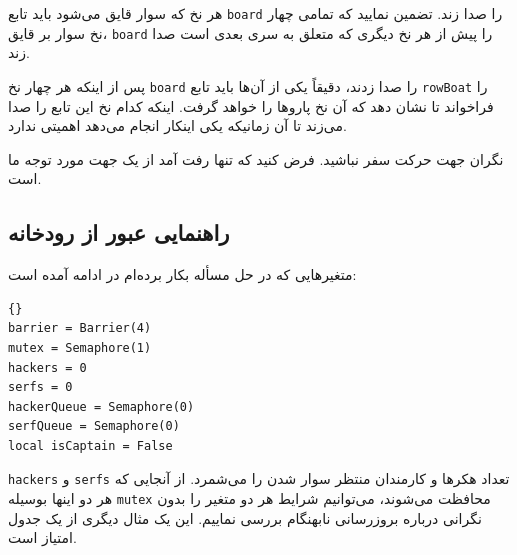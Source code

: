 \documentclass{book}
\newcommand{\clearemptydoublepage}{\newpage\cleardoublepage}
\begin{document}
    هر نخ که سوار قایق می‌شود باید تابع  {\tt board} را صدا زند. تضمین نمایید که تمامی چهار نخ سوار بر قایق،  {\tt board} را 
    پیش از هر نخ دیگری که متعلق به سری بعدی است صدا زند. 
    

    پس از اینکه هر چهار نخ  {\tt board} را صدا زدند، دقیقاً یکی از آن‌ها باید تابع {\tt rowBoat} را فراخواند تا نشان دهد که آن نخ 
    پاروها را خواهد گرفت. اینکه کدام نخ این تابع را صدا می‌زند تا آن زمانیکه یکی اینکار انجام می‌دهد اهمیتی ندارد. 

    نگران جهت حرکت سفر نباشید. فرض کنید که تنها رفت آمد از یک جهت مورد توجه ما است. 


\clearemptydoublepage
\subsection {راهنمایی عبور از رودخانه}

    متغیرهایی که در حل مسأله بکار برده‌ام در ادامه آمده است:‌

\begin{latin}
\begin{lstlisting}[title=\rl{راهنمایی عبور از رودخانه}]{}
barrier = Barrier(4)
mutex = Semaphore(1)
hackers = 0
serfs = 0
hackerQueue = Semaphore(0)
serfQueue = Semaphore(0)
local isCaptain = False
\end{lstlisting}
\end{latin}

    {\tt hackers} و {\tt serfs}
    تعداد هکرها و کارمندان منتظر سوار شدن را می‌شمرد. از آنجایی که هر دو اینها بوسیله {\tt mutex} محافظت می‌شوند، می‌توانیم شرایط هر دو متغیر را 
    بدون نگرانی درباره بروزرسانی‌ نابهنگام بررسی نماییم. این یک مثال دیگری از یک جدول امتیاز است. 
\end{document}
